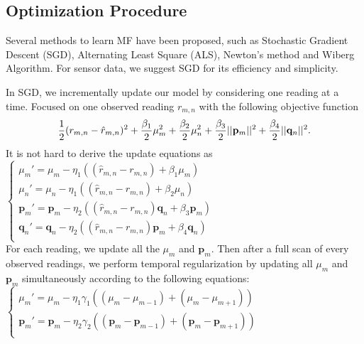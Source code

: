 \subsection{Optimization Procedure}
\label{optimation_procedure}
Several methods to learn MF have been proposed, such as Stochastic Gradient Descent (SGD)\cite{koren2009matrix,chih2008large}, Alternating Least Square (ALS)\cite{koren2009matrix,zhou2008large}, Newton's method\cite{buchanan2005damped} and Wiberg Algorithm\cite{okatani2007wiberg}.
For sensor data, we suggest SGD for its efficiency and simplicity. 

In SGD, we incrementally update our model by considering one reading at a time.
Focused on one observed reading $r_{m,n}$ with the following objective function
\begin{equation*} \small \frac{1}{2}(r_{m,n} - \hat{r}_{m,n})^2 + \frac{\beta_1}{2}\mu_m^2 + \frac{\beta_2}{2}\mu_n^2 + \frac{\beta_3}{2}||\mathbf{p}_m||^2 + \frac{\beta_4}{2}||\mathbf{q}_n||^2.\end{equation*}
It is not hard to derive the update equations as \\
\indent	$\begin{cases}
	\mu_m' = \mu_m - \eta_1 ((\hat{r}_{m,n}-r_{m,n}) + \beta_1 \mu_m) \\
	\mu_n' = \mu_n - \eta_1 ((\hat{r}_{m,n}-r_{m,n}) + \beta_2 \mu_n) \\
	\mathbf{p}_{m}' = \mathbf{p}_{m} - \eta_2 ((\hat{r}_{m,n}-r_{m,n})\mathbf{q}_{n} + \beta_3 \mathbf{p}_{m})\\
	\mathbf{q}_{n}' = \mathbf{q}_{n} - \eta_2 ((\hat{r}_{m,n}-r_{m,n})\mathbf{p}_{m} + \beta_4 \mathbf{q}_{n})\\
	\end{cases}$\\
For each reading, we update all the $\mu_m$ and $\mathbf{p}_m$. Then after a full scan of every observed readings, 
we perform temporal regularization by updating all $\mu_m$ and $\mathbf{p}_m$ simultaneously according to the following equations:\\
\indent $\begin{cases}
	\mu_m' = \mu_m - \eta_1 \gamma_1((\mu_m-\mu_{m-1})+(\mu_m-\mu_{m+1}))\\
	\mathbf{p}_{m}' = \mathbf{p}_{m} - \eta_2 \gamma_2((\mathbf{p}_{m}-\mathbf{p}_{m-1})+(\mathbf{p}_{m}-\mathbf{p}_{m+1}))\\
	\end{cases}$\\

